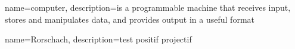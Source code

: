 {
  name=computer,
  description={is a programmable machine that receives input,
               stores and manipulates data, and provides
               output in a useful format}
}

{
  name=Rorschach,
  description={test positif projectif}
}

        

